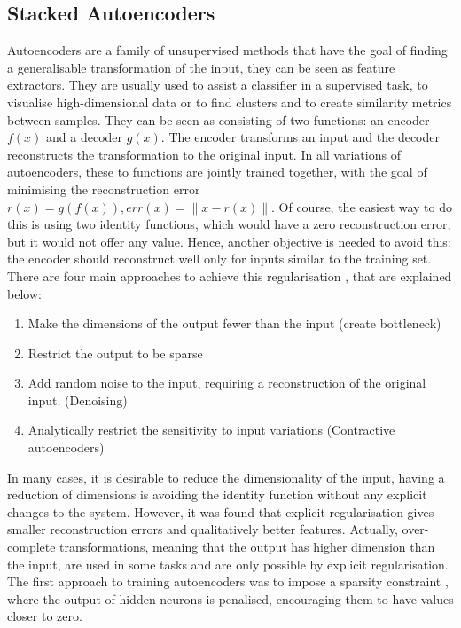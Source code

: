 \documentclass[a4paper]{article}
\begin{document}
		\subsection{Stacked Autoencoders}
		\label{sec:SAE}		
			Autoencoders are a family of unsupervised methods that have the goal of finding a generalisable transformation of the input, they can be seen as feature extractors. They are usually used to assist a classifier in a supervised task, to visualise high-dimensional data or to find clusters and to create similarity metrics between samples.
			They can be seen as consisting of two functions: an encoder $f(x)$ and a decoder $g(x)$. The encoder transforms an input  and the decoder reconstructs the transformation to the original input. In all variations of autoencoders, these to functions are jointly trained together, with the goal of minimising the reconstruction error $r(x)=g(f(x)), err(x)=\|x-r(x) \| $. Of course, the easiest way to do this is using two identity functions, which would have a zero reconstruction error, but it would not offer any value. Hence, another objective is needed to avoid this: the encoder should reconstruct well only for inputs similar to the training set. There are four main approaches to achieve this regularisation \cite{Bengio2013c}, that are explained below: 
			\begin{enumerate}
				\item Make the dimensions of the output fewer than the input (create bottleneck)
				\item Restrict the output to be sparse
				\item Add random noise to the input, requiring a reconstruction of the original input. (Denoising)
				\item Analytically restrict the sensitivity to input variations (Contractive autoencoders)
			\end{enumerate}
			In many cases, it is desirable to reduce the dimensionality of the input, having a reduction of dimensions is avoiding the identity function without any explicit changes to the system. However, it was found \cite{Bengio2013c} that explicit regularisation gives smaller reconstruction errors and qualitatively better features. Actually, over-complete transformations, meaning that the output has higher dimension than the input, are used in some tasks and are only possible by explicit regularisation.	
			The first approach to training autoencoders was to impose a sparsity constraint \cite{Bengio2007a,Ranzato2007}, where the output of hidden neurons is penalised, encouraging them to have values closer to zero. 
\end{document}
